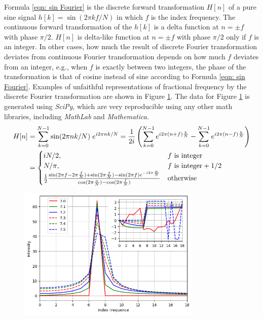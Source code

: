 \documentclass[twoside]{article}
\numberwithin{equation}{section}
\begin{document}
Formula \eqref{eqn: sin Fourier} is the discrete forward transformation $H[n]$ of a pure sine signal $h[k] = \sin(2\pi k f/N)$ in which $f$ is the index frequency.
The continuous forward transformation of the $h[k]$ is a delta function at $n = \pm f$ with phase $\pi/2$.
$H[n]$ is delta-like function at $n = \pm f$ with phase $\pi/2$ only if $f$ is an integer.
In other cases, how much the result of discrete Fourier transformation deviates from continuous Fourier transformation depends on how much $f$ deviates from an integer, e.g., when $f$ is exactly between two integers, the phase of the transformation is that of cosine instead of sine according to Formula \eqref{eqn: sin Fourier}.
Examples of unfaithful representations of fractional frequency by the discrete Fourier transformation are shown in Figure \ref{fig: FFT_Unfaithful}. 
The data for Figure \ref{fig: FFT_Unfaithful} is generated using \textit{SciPy}, which are very reproducible using any other math libraries, including \textit{MathLab} and \textit{Mathematica}.
\begin{align}
\centering
H[n] &=\sum_{k=0}^{N-1} \sin(2\pi n k/N) \; e^{i 2\pi n k/N} =
  \frac{1}{2 i} \left( \sum_{k=0}^{N-1} e^{i 2\pi (n+f)\frac{k}{N}}  - \sum_{k=0}^{N-1} e^{i 2\pi (n-f)\frac{k}{N}} \right) \nonumber \\
\label{eqn: sin Fourier}
&= \begin{cases}
  i N/2, & f \text{ is integer} \\
  N/\pi, & f \text{ is integer} + 1/2 \\
  \frac{1}{2} \frac{\sin(2\pi f - 2\pi \frac{f}{N}) + \sin(2\pi \frac{f}{N})-\sin(2\pi f) e^{-i 2\pi \frac{n}{N}}}{\cos(2\pi \frac{n}{N})-\cos(2\pi \frac{f}{N})} & \text{otherwise}
\end{cases}
\end{align}

\begin{figure}
\includegraphics[height=2.5in]{FFT_Unfaithful.png} 
\label{fig: FFT_Unfaithful}
\end{figure}
\end{document}
